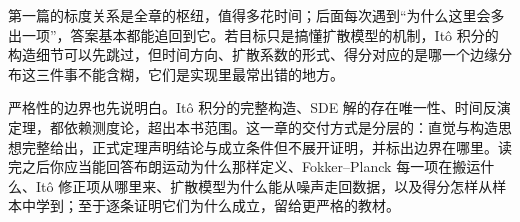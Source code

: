 第一篇的标度关系是全章的枢纽，值得多花时间；后面每次遇到``为什么这里会多出一项''，答案基本都能追回到它。若目标只是搞懂扩散模型的机制，Itô 积分的构造细节可以先跳过，但时间方向、扩散系数的形式、得分对应的是哪一个边缘分布这三件事不能含糊，它们是实现里最常出错的地方。

严格性的边界也先说明白。Itô 积分的完整构造、SDE 解的存在唯一性、时间反演定理，都依赖测度论，超出本书范围。这一章的交付方式是分层的：直觉与构造思想完整给出，正式定理声明结论与成立条件但不展开证明，并标出边界在哪里。读完之后你应当能回答布朗运动为什么那样定义、Fokker--Planck 每一项在搬运什么、Itô 修正项从哪里来、扩散模型为什么能从噪声走回数据，以及得分怎样从样本中学到；至于逐条证明它们为什么成立，留给更严格的教材。
